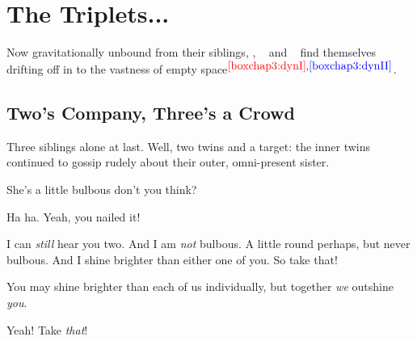 \documentclass[main.tex]{subfiles}
\begin{document}
\chapter{The Triplets...}


 
\par \nar Now gravitationally unbound from their siblings, \rmtaygete, \rmalcyone~ and \rmcelaeno~ find themselves drifting off in to the vastness of empty space$^{\textcolor{red}{\ref{boxchap3:dynI}},\textcolor{blue}{\ref{boxchap3:dynII}}}$.  

\section{Two's Company, Three's a Crowd}

\par \nar Three siblings alone at last.  Well, two twins and a target: the inner twins continued to gossip rudely about their outer, omni-present sister.

\par \Taygete She's a little bulbous don't you think?

\par \Alcyone  Ha ha.  Yeah, you nailed it!

\par \Celaeno  I can \textit{still} hear you two.  And I am \textit{not} bulbous.  A little round perhaps, but never bulbous.  And I shine brighter than either one of you.  So take that!

\par \Alcyone You may shine brighter than each of us individually, but together \textit{we} outshine \textit{you}.  

\par \Taygete Yeah!  Take \textit{that}!
\end{document}
